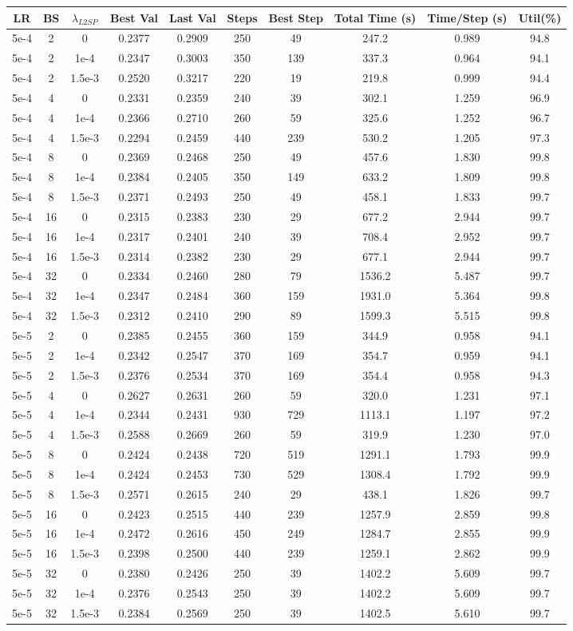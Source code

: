 \begin{table}[p]
\centering
\scriptsize
\renewcommand{\arraystretch}{0.9}
\begin{adjustbox}{max width=\textwidth,max totalheight=\textheight}
\begin{tabular}{cccccccccc}
\hline
LR & BS & $\lambda_{L2SP}$ & Best Val & Last Val & Steps & Best Step & Total Time (s) & Time/Step (s) & Util(\%)\\
\hline
5e-4&2&0&0.2377&0.2909&250&49&247.2&0.989&94.8\\
5e-4&2&1e-4&0.2347&0.3003&350&139&337.3&0.964&94.1\\
5e-4&2&1.5e-3&0.2520&0.3217&220&19&219.8&0.999&94.4\\
5e-4&4&0&0.2331&0.2359&240&39&302.1&1.259&96.9\\
5e-4&4&1e-4&0.2366&0.2710&260&59&325.6&1.252&96.7\\
5e-4&4&1.5e-3&0.2294&0.2459&440&239&530.2&1.205&97.3\\
5e-4&8&0&0.2369&0.2468&250&49&457.6&1.830&99.8\\
5e-4&8&1e-4&0.2384&0.2405&350&149&633.2&1.809&99.8\\
5e-4&8&1.5e-3&0.2371&0.2493&250&49&458.1&1.833&99.7\\
5e-4&16&0&0.2315&0.2383&230&29&677.2&2.944&99.7\\
5e-4&16&1e-4&0.2317&0.2401&240&39&708.4&2.952&99.7\\
5e-4&16&1.5e-3&0.2314&0.2382&230&29&677.1&2.944&99.7\\
5e-4&32&0&0.2334&0.2460&280&79&1536.2&5.487&99.7\\
5e-4&32&1e-4&0.2347&0.2484&360&159&1931.0&5.364&99.8\\
5e-4&32&1.5e-3&0.2312&0.2410&290&89&1599.3&5.515&99.8\\

5e-5&2&0&0.2385&0.2455&360&159&344.9&0.958&94.1\\
5e-5&2&1e-4&0.2342&0.2547&370&169&354.7&0.959&94.1\\
5e-5&2&1.5e-3&0.2376&0.2534&370&169&354.4&0.958&94.3\\
5e-5&4&0&0.2627&0.2631&260&59&320.0&1.231&97.1\\
5e-5&4&1e-4&0.2344&0.2431&930&729&1113.1&1.197&97.2\\
5e-5&4&1.5e-3&0.2588&0.2669&260&59&319.9&1.230&97.0\\
5e-5&8&0&0.2424&0.2438&720&519&1291.1&1.793&99.9\\
5e-5&8&1e-4&0.2424&0.2453&730&529&1308.4&1.792&99.9\\
5e-5&8&1.5e-3&0.2571&0.2615&240&29&438.1&1.826&99.7\\
5e-5&16&0&0.2423&0.2515&440&239&1257.9&2.859&99.8\\
5e-5&16&1e-4&0.2472&0.2616&450&249&1284.7&2.855&99.9\\
5e-5&16&1.5e-3&0.2398&0.2500&440&239&1259.1&2.862&99.9\\
5e-5&32&0&0.2380&0.2426&250&39&1402.2&5.609&99.7\\
5e-5&32&1e-4&0.2376&0.2543&250&39&1402.2&5.609&99.7\\
5e-5&32&1.5e-3&0.2384&0.2569&250&39&1402.5&5.610&99.7\\


\end{tabular}
\end{adjustbox}
\end{table}
